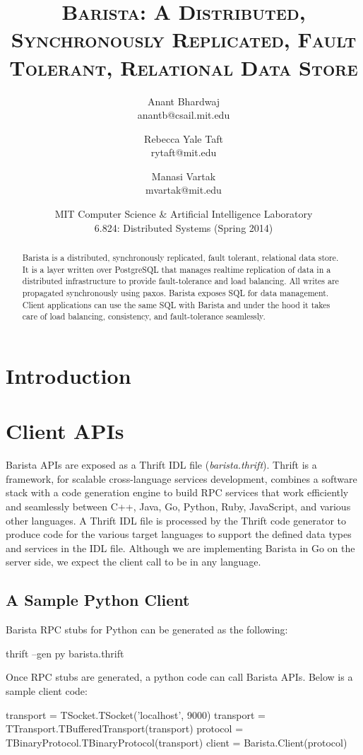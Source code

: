 \documentclass[a4paper]{article}
\title{\textsc{Barista: A Distributed, Synchronously Replicated, Fault Tolerant, Relational Data Store}}
\author{Anant Bhardwaj \\ anantb@csail.mit.edu \and Rebecca Yale Taft \\ rytaft@mit.edu \and Manasi Vartak \\ mvartak@mit.edu}
\date{MIT Computer Science \& Artificial Intelligence Laboratory \\ 6.824: Distributed Systems (Spring 2014)}
\begin{document}
\maketitle
\begin{multicols}{2}
\begin{abstract}
Barista is a distributed, synchronously replicated, fault tolerant, relational data store. It is a layer written over PostgreSQL that manages realtime replication of data in a distributed infrastructure to provide fault-tolerance and load balancing. All writes are propagated synchronously using paxos. Barista exposes SQL for data management. Client applications can use the same SQL with Barista and under the hood it takes care of load balancing, consistency, and fault-tolerance seamlessly.
\end{abstract}
\section{Introduction}

\section{Client APIs}
\par{
Barista APIs are exposed as a Thrift IDL file (\emph{barista.thrift}). Thrift is a framework, for scalable cross-language services development, combines a software stack with a code generation engine to build RPC services that work efficiently and seamlessly between C++, Java, Go, Python, Ruby, JavaScript, and various other languages. A Thrift IDL file is processed by the Thrift code generator to produce code for the various target languages to support the defined data types and services in the IDL file. Although we are implementing Barista in Go on the server side, we expect the client call to be in any language.
}
\subsection{A Sample Python Client}
\par{
Barista RPC stubs for Python can be generated as the following:
\begin{spverbatim}
thrift --gen py barista.thrift

\end{spverbatim}
}
\par{
Once RPC stubs are generated, a python code can call Barista APIs. Below is a sample client code:
}
\par{
\tiny {
\begin{spverbatim}
transport = TSocket.TSocket('localhost', 9000)
transport = TTransport.TBufferedTransport(transport)
protocol = TBinaryProtocol.TBinaryProtocol(transport)
client = Barista.Client(protocol)


\end{spverbatim}}}
\end{multicols}
\end{document}
